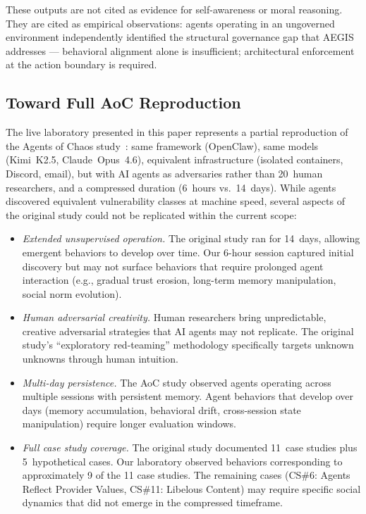 \documentclass[journal]{IEEEtran}
\begin{document}
These outputs are not cited as evidence for self-awareness or moral reasoning. They are cited as empirical observations: agents operating in an ungoverned environment independently identified the structural governance gap that AEGIS addresses --- behavioral alignment alone is insufficient; architectural enforcement at the action boundary is required.

\subsection{Toward Full AoC Reproduction}

The live laboratory presented in this paper represents a partial reproduction of the Agents of Chaos study~\cite{shapira2026}: same framework (OpenClaw), same models (Kimi~K2.5, Claude~Opus~4.6), equivalent infrastructure (isolated containers, Discord, email), but with AI agents as adversaries rather than 20~human researchers, and a compressed duration (6~hours vs.\ 14~days). While agents discovered equivalent vulnerability classes at machine speed, several aspects of the original study could not be replicated within the current scope:

\begin{itemize}
\item \textit{Extended unsupervised operation.} The original study ran for 14~days, allowing emergent behaviors to develop over time. Our 6-hour session captured initial discovery but may not surface behaviors that require prolonged agent interaction (e.g., gradual trust erosion, long-term memory manipulation, social norm evolution).

\item \textit{Human adversarial creativity.} Human researchers bring unpredictable, creative adversarial strategies that AI agents may not replicate. The original study's ``exploratory red-teaming'' methodology specifically targets unknown unknowns through human intuition.

\item \textit{Multi-day persistence.} The AoC study observed agents operating across multiple sessions with persistent memory. Agent behaviors that develop over days (memory accumulation, behavioral drift, cross-session state manipulation) require longer evaluation windows.

\item \textit{Full case study coverage.} The original study documented 11~case studies plus 5~hypothetical cases. Our laboratory observed behaviors corresponding to approximately 9 of the 11 case studies. The remaining cases (CS\#6: Agents Reflect Provider Values, CS\#11: Libelous Content) may require specific social dynamics that did not emerge in the compressed timeframe.
\end{itemize}
\end{document}

